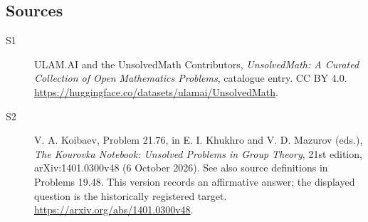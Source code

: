 \documentclass[11pt]{article}
\begin{document}
\subsection{Sources}
\begin{description}
\item[\hypertarget{source:statement:1}{S1}] ULAM.AI and the UnsolvedMath Contributors, \emph{UnsolvedMath: A Curated Collection of Open Mathematics Problems}, catalogue entry. CC BY 4.0. \url{https://huggingface.co/datasets/ulamai/UnsolvedMath}.
\item[\hypertarget{source:statement:2}{S2}] V. A. Koibaev, Problem 21.76, in E. I. Khukhro and V. D. Mazurov (eds.), \emph{The Kourovka Notebook: Unsolved Problems in Group Theory}, 21st edition, arXiv:1401.0300v48 (6 October 2026). See also source definitions in Problems 19.48. This version records an affirmative answer; the displayed question is the historically registered target. \url{https://arxiv.org/abs/1401.0300v48}.
\end{description}
\label{end:statement}
\end{document}
